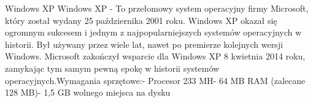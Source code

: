 \begin{frame}{Windows XP}
Windows XP -  To przełomowy system operacyjny firmy Microsoft, który został wydany 25 października 2001 roku. Windows XP okazał się ogromnym sukcesem i jednym z najpopularniejszych systemów operacyjnych w historii. Był używany przez wiele lat, nawet po premierze kolejnych wersji Windows. Microsoft zakończył wsparcie dla Windows XP 8 kwietnia 2014 roku, zamykając tym samym pewną epokę w historii systemów operacyjnych.Wymagania sprzętowe:- Procesor 233 MH- 64 MB RAM (zalecane 128 MB)- 1,5 GB wolnego miejsca na dysku

\end{frame}
